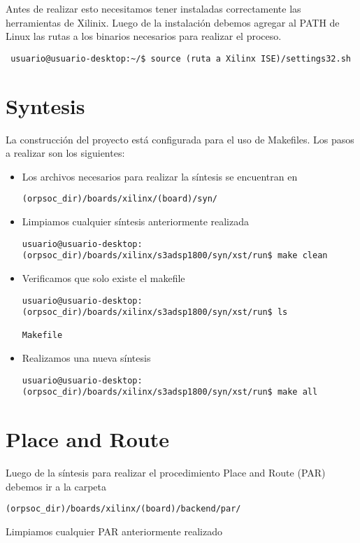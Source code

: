 Antes de realizar esto necesitamos tener instaladas correctamente las herramientas de Xilinix. Luego de la instalación debemos agregar al PATH de Linux las rutas a los binarios necesarios para realizar el proceso. 

\begin{verbatim}
 usuario@usuario-desktop:~/$ source (ruta a Xilinx ISE)/settings32.sh  
\end{verbatim}

 \section{Syntesis}
La construcción del proyecto está configurada para el uso de Makefiles. Los pasos a realizar son los siguientes:

\begin{itemize}
\item Los archivos necesarios para realizar la síntesis se encuentran en 
\begin{verbatim}
(orpsoc_dir)/boards/xilinx/(board)/syn/
\end{verbatim}

\item Limpiamos cualquier síntesis anteriormente realizada 

\begin{verbatim}
usuario@usuario-desktop:(orpsoc_dir)/boards/xilinx/s3adsp1800/syn/xst/run$ make clean
\end{verbatim}

\item Verificamos que solo existe el makefile
\begin{verbatim}
usuario@usuario-desktop:(orpsoc_dir)/boards/xilinx/s3adsp1800/syn/xst/run$ ls

Makefile
\end{verbatim}

\item Realizamos una nueva síntesis
\begin{verbatim}
usuario@usuario-desktop:(orpsoc_dir)/boards/xilinx/s3adsp1800/syn/xst/run$ make all
\end{verbatim}
\end{itemize} 

 \section{Place and Route}
Luego de la síntesis para realizar el procedimiento Place and Route (PAR) debemos ir a la carpeta
\begin{verbatim}
(orpsoc_dir)/boards/xilinx/(board)/backend/par/
\end{verbatim}
Limpiamos cualquier PAR anteriormente realizado


